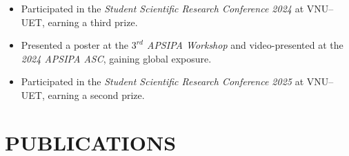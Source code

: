 \documentclass[a4paper,9pt]{extarticle}
\begin{document}
\begin{itemize}
    \item Participated in the \textit{Student Scientific Research Conference 2024} at VNU--UET, earning a third prize.
    \item Presented a poster at the \textit{\(3^{rd}\) APSIPA Workshop} and video-presented at the \textit{2024 APSIPA ASC}, gaining global exposure.
    \item Participated in the \textit{Student Scientific Research Conference 2025} at VNU--UET, earning a second prize.
\end{itemize}



\section*{PUBLICATIONS}
\end{document}
